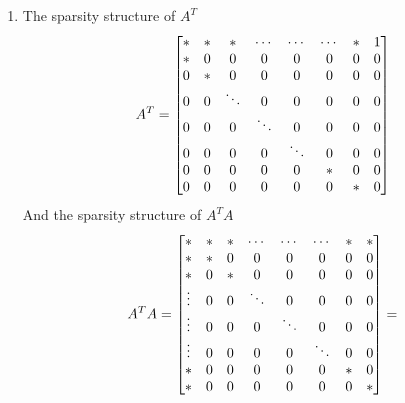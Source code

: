 \begin{enumerate}
\item 
The sparsity structure of $A^{T}$
$$
A^{T} = 
\setcounter{MaxMatrixCols}{11}
\begin{bmatrix}
* & * & * & \cdots & \cdots & \cdots & * & 1\\
* & 0 & 0 & 0 & 0 & 0 & 0 & 0\\
0 & * & 0 & 0 & 0 & 0 & 0 & 0\\
0 & 0 & \ddots & 0 & 0 & 0 & 0 & 0\\
0 & 0 & 0 & \ddots & 0 & 0 & 0 & 0\\
0 & 0 & 0 & 0 & \ddots & 0 & 0 & 0\\
0 & 0 & 0 & 0 & 0 & * & 0 & 0\\
0 & 0 & 0 & 0 & 0 & 0 & * & 0\\
\end{bmatrix}
$$
 And the sparsity structure of $A^{T}A$ 
$$
A^{T}A = 
\setcounter{MaxMatrixCols}{11}
\begin{bmatrix}
* & * & * & \cdots & \cdots & \cdots & * & *\\
* & * & 0 & 0 & 0 & 0 & 0 & 0\\
* & 0 & * & 0 & 0 & 0 & 0 & 0\\
\vdots & 0 & 0 & \ddots & 0 & 0 & 0 & 0\\
\vdots & 0 & 0 & 0 & \ddots & 0 & 0 & 0\\
\vdots & 0 & 0 & 0 & 0 & \ddots & 0 & 0\\
* & 0 & 0 & 0 & 0 & 0 & * & 0\\
* & 0 & 0 & 0 & 0 & 0 & 0 & *\\
\end{bmatrix}
= 
$$


\end{enumerate}
